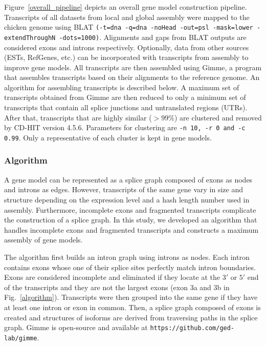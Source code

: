 \documentclass[10pt]{article}
\begin{document}
Figure~\ref{overall_pipeline} depicts an overall gene model construction
pipeline.  Transcripts of all datasets from local and global assembly were
mapped to the chicken genome using BLAT\cite{Kent:2002tv} \texttt{(-t=dna -q=dna
-noHead -out=psl -mask=lower -extendThroughN -dots=1000)}.  Alignments and gaps
from BLAT outputs are considered exons and introns respectively.  Optionally,
data from other sources (ESTs, RefGenes, etc.) can be incorporated with
transcripts from assembly to improve gene models.  All transcripts are then
assembled using Gimme, a program that assembles transcripts based on their
alignments to the reference genome.  An algorithm for assembling transcripts is
described below.  A maximum set of transcripts obtained from Gimme are then
reduced to only a minimum set of transcripts that contain all splice junctions
and untranslated regions (UTRs).  After that, transcripts that are highly
similar ($>99\%$) are clustered and removed by CD-HIT version
4.5.6\cite{Li:2006hr}.  Parameters for clustering are \texttt{-n 10, -r 0 and -c
0.99}.  Only a representative of each cluster is kept in gene models.

\subsubsection*{Algorithm}

A gene model can be represented as a splice graph composed of exons as nodes and
introns as edges.  However, transcripts of the same gene vary in size and
structure depending on the expression level and a hash length number used in
assembly.  Furthermore, incomplete exons and fragmented transcripts complicate
the construction of a splice graph.  In this study, we developed an algorithm
that handles incomplete exons and fragmented transcripts and constructs a
maximum assembly of gene models.

The algorithm first builds an intron graph using introns as nodes.  Each intron
contains exons whose one of their splice sites perfectly match intron
boundaries.  Exons are considered incomplete and eliminated if they locate at
the $3'$ or $5'$ end of the transcripts and they are not the largest exons (exon
3a and 3b in Fig.~\ref{algorithm}).  Transcripts were then grouped into the same
gene if they have at least one intron or exon in common.  Then, a splice graph
composed of exons is created and structures of isoforms are derived from
traversing paths in the splice graph.  Gimme is open-source and available at
\texttt{https://github.com/ged-lab/gimme}.
\end{document}
